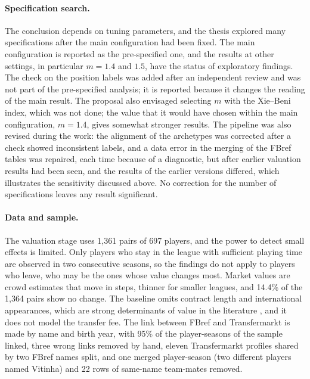\paragraph{Specification search.} The conclusion depends on tuning parameters, and the thesis explored many specifications after the main configuration had been fixed. The main configuration is reported as the pre-specified one, and the results at other settings, in particular $m=1.4$ and $1.5$, have the status of exploratory findings. The check on the position labels was added after an independent review and was not part of the pre-specified analysis; it is reported because it changes the reading of the main result. The proposal also envisaged selecting $m$ with the Xie--Beni index, which was not done; the value that it would have chosen within the main configuration, $m=1.4$, gives somewhat stronger results. The pipeline was also revised during the work: the alignment of the archetypes was corrected after a check showed inconsistent labels, and a data error in the merging of the FBref tables was repaired, each time because of a diagnostic, but after earlier valuation results had been seen, and the results of the earlier versions differed, which illustrates the sensitivity discussed above. No correction for the number of specifications leaves any result significant.

\paragraph{Data and sample.} The valuation stage uses 1,361 pairs of 697 players, and the power to detect small effects is limited. Only players who stay in the league with sufficient playing time are observed in two consecutive seasons, so the findings do not apply to players who leave, who may be the ones whose value changes most. Market values are crowd estimates that move in steps, thinner for smaller leagues, and 14.4\% of the 1,364 pairs show no change. The baseline omits contract length and international appearances, which are strong determinants of value in the literature \cite{franceschi2024determinants,poli2024statistical}, and it does not model the transfer fee. The link between FBref and Transfermarkt is made by name and birth year, with 95\% of the player-seasons of the sample linked, three wrong links removed by hand, eleven Transfermarkt profiles shared by two FBref names split, and one merged player-season (two different players named Vitinha) and 22 rows of same-name team-mates removed.

